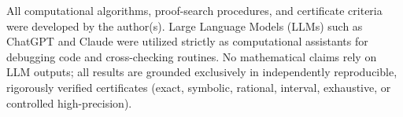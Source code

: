 \medskip\noindent All computational algorithms, proof-search procedures, and certificate criteria were developed by the author(s). Large Language Models (LLMs) such as ChatGPT and Claude were utilized strictly as computational assistants for debugging code and cross-checking routines. No mathematical claims rely on LLM outputs; all results are grounded exclusively in independently reproducible, rigorously verified certificates (exact, symbolic, rational, interval, exhaustive, or controlled high-precision).
